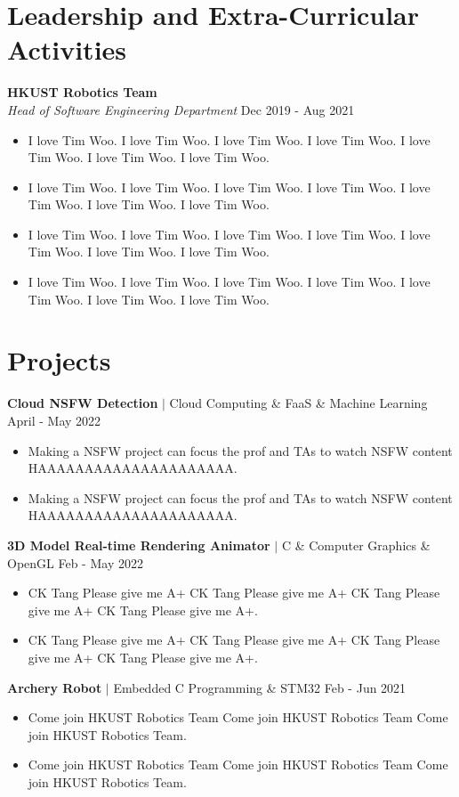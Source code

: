 \documentclass[letterpaper,10.8pt]{article}
\newcommand{\plus}{\raisebox{.4\height}{\scalebox{.6}{+}}}
\begin{document}
\section{Leadership and Extra-Curricular Activities}
\textbf{HKUST Robotics Team}\\
\emph{Head of Software Engineering Department}  \hfill Dec 2019 - Aug 2021\\
\begin{itemize}
  \item I love Tim Woo. I love Tim Woo. I love Tim Woo. I love Tim Woo. I love Tim Woo. I love Tim Woo. I love Tim Woo.
  \item I love Tim Woo. I love Tim Woo. I love Tim Woo. I love Tim Woo. I love Tim Woo. I love Tim Woo. I love Tim Woo.
  \item I love Tim Woo. I love Tim Woo. I love Tim Woo. I love Tim Woo. I love Tim Woo. I love Tim Woo. I love Tim Woo.
  \item I love Tim Woo. I love Tim Woo. I love Tim Woo. I love Tim Woo. I love Tim Woo. I love Tim Woo. I love Tim Woo.    %
\end{itemize}

\section{Projects}
\textbf{Cloud NSFW Detection} $\mid$ Cloud Computing \& FaaS \& Machine Learning \hfill April - May 2022\\
\begin{itemize}
  \item Making a NSFW project can focus the prof and TAs to watch NSFW content HAAAAAAAAAAAAAAAAAAAAA.
  \item Making a NSFW project can focus the prof and TAs to watch NSFW content HAAAAAAAAAAAAAAAAAAAAA.
\end{itemize}
\textbf{3D Model Real-time Rendering Animator} $\mid$ C\plus{}\plus{} \& Computer Graphics \& OpenGL \hfill Feb - May 2022\\
\begin{itemize}
  \item CK Tang Please give me A+ CK Tang Please give me A+ CK Tang Please give me A+ CK Tang Please give me A+.
  \item CK Tang Please give me A+ CK Tang Please give me A+ CK Tang Please give me A+ CK Tang Please give me A+.
\end{itemize}
\textbf{Archery Robot} $\mid$ Embedded C Programming \& STM32 \hfill Feb - Jun 2021\\
\begin{itemize}
  \item Come join HKUST Robotics Team Come join HKUST Robotics Team Come join HKUST Robotics Team.
  \item Come join HKUST Robotics Team Come join HKUST Robotics Team Come join HKUST Robotics Team.
\end{itemize}
\end{document}
